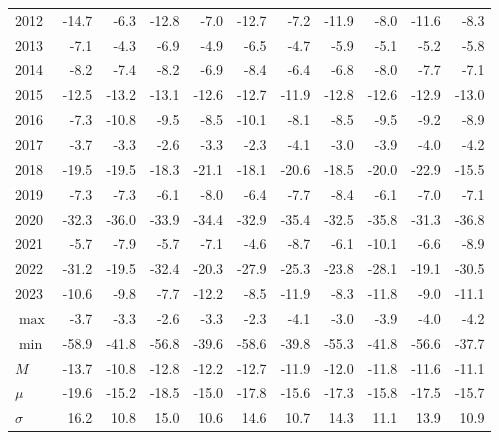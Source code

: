 \documentclass{article}
\begin{document}
\begin{table}[!ht]
\begin{tabular}{l | rr | rr | rr | rr| rr}
2012 & \cellcolor{red!25}-14.7 & \cellcolor{green!25}-6.3 & -12.8 & -7.0 & -12.7 & -7.2 & -11.9 & -8.0 & -11.6 & -8.3 \\
2013 & \cellcolor{red!25}-7.1 & \cellcolor{green!25}-4.3 & -6.9 & -4.9 & -6.5 & -4.7 & -5.9 & -5.1 & -5.2 & -5.8 \\
2014 & -8.2 & -7.4 & -8.2 & -6.9 & \cellcolor{red!25}-8.4 & \cellcolor{green!25}-6.4 & -6.8 & -8.0 & -7.7 & -7.1 \\
2015 & -12.5 & \cellcolor{red!25}-13.2 & -13.1 & -12.6 & -12.7 & \cellcolor{green!25}-11.9 & -12.8 & -12.6 & -12.9 & -13.0 \\
2016 & \cellcolor{green!25}-7.3 & \cellcolor{red!25}-10.8 & -9.5 & -8.5 & -10.1 & -8.1 & -8.5 & -9.5 & -9.2 & -8.9 \\
2017 & -3.7 & -3.3 & -2.6 & -3.3 & \cellcolor{green!25}-2.3 & -4.1 & -3.0 & -3.9 & -4.0 & \cellcolor{red!25}-4.2 \\
2018 & -19.5 & -19.5 & -18.3 & -21.1 & -18.1 & -20.6 & -18.5 & -20.0 & \cellcolor{red!25}-22.9 & \cellcolor{green!25}-15.5 \\
2019 & -7.3 & -7.3 & -6.1 & -8.0 & -6.4 & -7.7 & \cellcolor{red!25}-8.4 & \cellcolor{green!25}-6.1 & -7.0 & -7.1 \\
2020 & -32.3 & -36.0 & -33.9 & -34.4 & -32.9 & -35.4 & -32.5 & -35.8 & \cellcolor{green!25}-31.3 & \cellcolor{red!25}-36.8 \\
2021 & -5.7 & -7.9 & -5.7 & -7.1 & \cellcolor{green!25}-4.6 & -8.7 & -6.1 & \cellcolor{red!25}-10.1 & -6.6 & -8.9 \\
2022 & -31.2 & -19.5 & \cellcolor{red!25}-32.4 & -20.3 & -27.9 & -25.3 & -23.8 & -28.1 & \cellcolor{green!25}-19.1 & -30.5 \\
2023 & -10.6 & -9.8 & \cellcolor{green!25}-7.7 & \cellcolor{red!25}-12.2 & -8.5 & -11.9 & -8.3 & -11.8 & -9.0 & -11.1 \\\hline

$\max$ & -3.7 & -3.3 & -2.6 & -3.3 & \cellcolor{green!25}-2.3 & -4.1 & -3.0 & -3.9 & -4.0 & \cellcolor{red!25}-4.2 \\
$\min$ & \cellcolor{red!25}-58.9 & -41.8 & -56.8 & -39.6 & -58.6 & -39.8 & -55.3 & -41.8 & -56.6 & \cellcolor{green!25}-37.7 \\
$M$ & \cellcolor{red!25}-13.7 & \cellcolor{green!25}-10.8 & -12.8 & -12.2 & -12.7 & -11.9 & -12.0 & -11.8 & -11.6 & -11.1 \\
$\mu$  & \cellcolor{red!25}-19.6 & -15.2 & -18.5 & \cellcolor{green!25}-15.0 & -17.8 & -15.6 & -17.3 & -15.8 & -17.5 & -15.7 \\
$\sigma$ & \cellcolor{green!25}16.2 & 10.8 & 15.0 & \cellcolor{red!25}10.6 & 14.6 & 10.7 & 14.3 & 11.1 & 13.9 & 10.9 \\

\hline
    \end{tabular}
\end{table}
\end{document}
